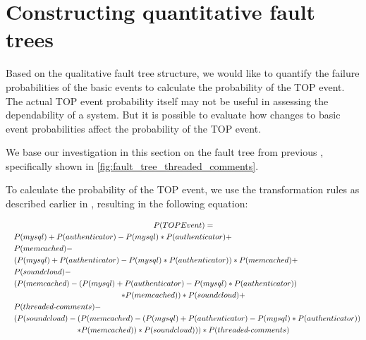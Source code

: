 
\chapter{Constructing quantitative fault trees}
\label{chap:quantitive_fault_tree}

Based on the qualitative fault tree structure, we would like to quantify the failure probabilities of the basic events to calculate the probability of the TOP event. The actual TOP event probability itself may not be useful in assessing the dependability of a system. But it is possible to evaluate how changes to basic event probabilities affect the probability of the TOP event.

We base our investigation in this section on the fault tree from previous , specifically shown in \autoref{fig:fault_tree_threaded_comments}.

To calculate the probability of the TOP event, we use the transformation rules as described earlier in , resulting in the following equation:

%


{\scriptsize
\begin{multline} \label{eq:quant_prob}
  P(TOP Event) = \\
     \shoveleft{P(mysql) + P(authenticator) - P(mysql) * P(authenticator) +} \\
     \shoveleft{P(memcached) -} \\
     \shoveleft{(P(mysql) + P(authenticator) - P(mysql) * P(authenticator)) * P(memcached) +} \\
     \shoveleft{P(soundcloud) - }\\
     \shoveleft{(P(memcached) - (P(mysql) + P(authenticator) - P(mysql) * P(authenticator))} \\
     * P(memcached)) * P(soundcloud) + \\
     \shoveleft{P(threaded\mbox{-}comments) -} \\
     \shoveleft{(P(soundcloud) - (P(memcached) - (P(mysql) + P(authenticator) - P(mysql) * P(authenticator))} \\
     * P(memcached)) * P(soundcloud))) * P(threaded\mbox{-}comments)
\end{multline}
}

